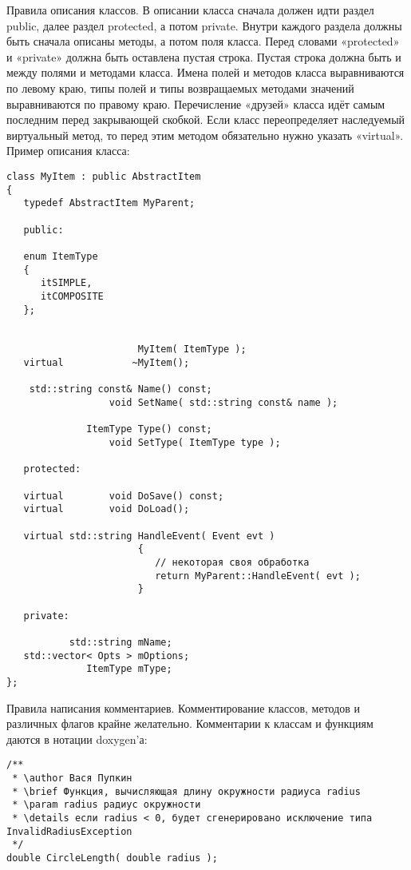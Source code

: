 \documentclass{article}
\begin{document}
\vskip0.5cm
\Large Правила описания классов.
\normalsize
\vskip0.5cm
В описании класса сначала должен идти раздел public, далее раздел protected, а потом private. Внутри каждого раздела должны быть сначала описаны методы, а потом поля класса. 
Перед словами «protected» и «private» должна быть оставлена пустая строка. Пустая строка должна быть и между полями и методами класса. 
Имена полей и методов класса выравниваются по левому краю, типы полей и типы возвращаемых методами значений выравниваются по правому краю.
Перечисление «друзей» класса идёт самым последним перед закрывающей скобкой.
Если класс переопределяет наследуемый виртуальный метод, то перед этим методом обязательно нужно указать «virtual».
Пример описания класса:
\begin{lstlisting}
class MyItem : public AbstractItem
{
   typedef AbstractItem MyParent;
   
   public:
   
   enum ItemType
   {
      itSIMPLE,
      itCOMPOSITE
   };
   
   
                       MyItem( ItemType );
   virtual            ~MyItem();
   
    std::string const& Name() const;
                  void SetName( std::string const& name );
   
              ItemType Type() const;
                  void SetType( ItemType type );
   
   protected:
   
   virtual        void DoSave() const;
   virtual        void DoLoad();
   
   virtual std::string HandleEvent( Event evt )
                       {
                          // некоторая своя обработка
                          return MyParent::HandleEvent( evt );
                       }
   
   private:
   
           std::string mName;
   std::vector< Opts > mOptions;
              ItemType mType;
};
\end{lstlisting}

\vskip0.5cm
\Large Правила написания комментариев.
\normalsize
\vskip0.5cm
Комментирование классов, методов и различных флагов крайне желательно. Комментарии к классам и функциям даются в нотации doxygen'а:
\begin{lstlisting}
/**
 * \author Вася Пупкин
 * \brief Функция, вычисляющая длину окружности радиуса radius
 * \param radius радиус окружности
 * \details если radius < 0, будет сгенерировано исключение типа InvalidRadiusException
 */
double CircleLength( double radius );
\end{lstlisting}
\end{document}
